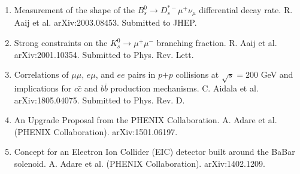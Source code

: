 \documentclass[11pt]{article}
\begin{document}
\begin{flushleft}
\begin{center}
\begin{enumerate}
		\item Measurement of the shape of the $B_s^0\rightarrow D_s^{*-}\mu^+\nu_\mu$ differential decay rate. R. Aaij et al. arXiv:2003.08453. Submitted to JHEP.
				
		\item Strong constraints on the $K_s^0\rightarrow\mu^+\mu^-$ branching fraction. R. Aaij et al. arXiv:2001.10354. Submitted to Phys. Rev. Lett.
	
			
		\item Correlations of $\mu\mu$, $e\mu$, and $ee$ pairs in $p$$+$$p$ collisions at $\sqrt{s}=200$ GeV and implications for $c\bar{c}$ and $b\bar{b}$ production mechanisms. C. Aidala et al. arXiv:1805.04075. Submitted to Phys. Rev. D.
		\item An Upgrade Proposal from the PHENIX Collaboration. A. Adare et al. (PHENIX Collaboration). arXiv:1501.06197.
		\item Concept for an Electron Ion Collider (EIC) detector built around the BaBar solenoid. A. Adare et al. (PHENIX Collaboration). arXiv:1402.1209.
		
\end{enumerate}
	
\end{center}


\end{flushleft}









\end{document}
